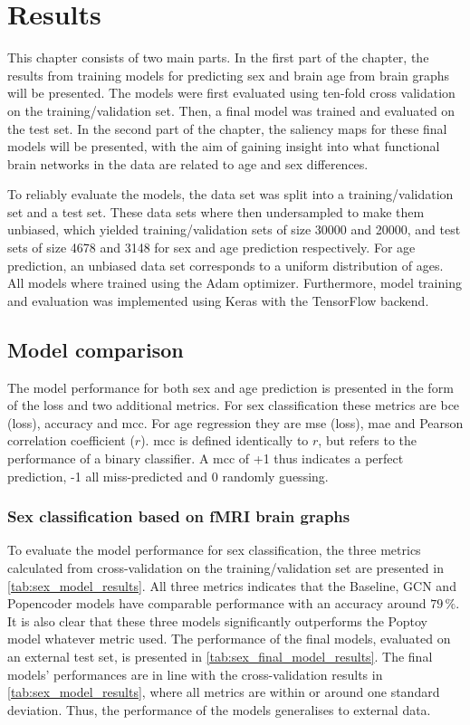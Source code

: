 \chapter{Results}
This chapter consists of two main parts. In the first part of the chapter, the results from training models for predicting sex and brain age from brain graphs will be presented. The models were first evaluated using ten-fold cross validation on the training/validation set. Then, a final model was trained and evaluated on the test set. In the second part of the chapter, the saliency maps for these final models will be presented, with the aim of gaining insight into what functional brain networks in the data are related to age and sex differences. 

To reliably evaluate the models, the data set was split into a training/validation set and a test set. These data sets where then undersampled to make them unbiased, which yielded training/validation sets of size 30000 and 20000, and test sets of size 4678 and 3148 for sex and age prediction respectively. For age prediction, an unbiased data set corresponds to a uniform distribution of ages. All models where trained using the Adam optimizer. Furthermore, model training and evaluation was implemented using Keras with the TensorFlow backend. 

\section{Model comparison}
\label{sec:model_pred}
The model performance for both sex and age prediction is presented in the form of the loss and two additional metrics. For sex classification these metrics are \acrfull{bce} (loss), accuracy and \acrfull{mcc}. For age regression they are \acrfull{mse} (loss), \acrfull{mae} and Pearson correlation coefficient ($r$). \acrshort{mcc} is defined identically to $r$, but refers to the performance of a binary classifier. A \acrshort{mcc} of +1 thus indicates a perfect prediction, -1 all miss-predicted and 0 randomly guessing.

\subsection{Sex classification based on fMRI brain graphs}

To evaluate the model performance for sex classification, the three metrics calculated from cross-validation on the training/validation set are presented in \cref{tab:sex_model_results}. All three metrics indicates that the Baseline, GCN and Popencoder models have comparable performance with an accuracy around $79\,\%$. It is also clear that these three models significantly outperforms the Poptoy model whatever metric used. The performance of the final models, evaluated on an external test set, is presented in \cref{tab:sex_final_model_results}. The final models' performances are in line with the cross-validation results in \cref{tab:sex_model_results}, where all metrics are within or around one standard deviation. Thus, the performance of the models generalises to external data.

